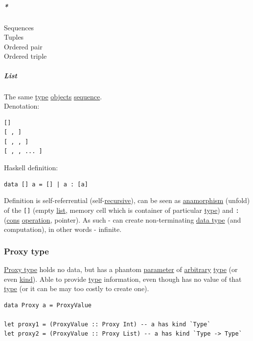 \documentclass[11pt]{article}
\begin{document}
\subparagraph{\emph{*}}
\label{sec:org89f5c0e}

\label{orga383401}Sequences\\
\label{orga3dc9be}Tuples\\
\label{org8ffd3ce}Ordered pair\\
\label{org294bc1c}Ordered triple\\

\subparagraph{\label{org874a6e0}List}
\label{sec:orgdff52da}
The same \hyperref[orgc4aea2f]{type} \hyperref[org363acc2]{objects} \hyperref[org522d1b0]{sequence}.\\

Denotation:\\
\begin{verbatim}
[]
[ , ]
[ , , ]
[ , , ... ]
\end{verbatim}

Haskell definition:\\
\begin{verbatim}
data [] a = [] | a : [a]
\end{verbatim}

Definition is self-referrential (self-\hyperref[orgf513e66]{recursive}), can be seen as \hyperref[org91e372a]{anamorphism} (unfold) of the \texttt{[]} (empty \hyperref[org874a6e0]{list}, memory cell which is container of particular \hyperref[orgc4aea2f]{type}) and \texttt{:} (\hyperref[org803d284]{cons} \hyperref[org1173fe8]{operation}, pointer). As such - can create non-terminating \hyperref[org212d9c3]{data type} (and computation), in other words - infinite.\\

\subsubsection{\label{orgd50d098}Proxy type}
\label{sec:org22500e5}
\hyperref[orgd50d098]{Proxy type} holds no data, but has a phantom \hyperref[org0e7674e]{parameter} of \hyperref[orga23d095]{arbitrary} \hyperref[orgc4aea2f]{type} (or even \hyperref[orgd0eb143]{kind}). Able to provide \hyperref[orgc4aea2f]{type} information, even though has no value of that \hyperref[orgc4aea2f]{type} (or it can be may too costly to create one).\\
\begin{verbatim}
data Proxy a = ProxyValue

let proxy1 = (ProxyValue :: Proxy Int) -- a has kind `Type`
let proxy2 = (ProxyValue :: Proxy List) -- a has kind `Type -> Type`
\end{verbatim}
\end{document}
